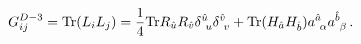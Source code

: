 \begin{equation}
\label{compute}
 G^{D-3}_{ij} = {\rm Tr }(L_iL_j)= \frac{1}{4} {\rm Tr} R_{\hat u}R_{\hat
v}\delta^{\hat u}_{~u}\delta^{\hat v}_{~v}+ {\rm Tr }(H_{\hat a}H_{\hat b})a^{\hat
a}_{~\alpha}a^{\hat b}_{~\beta}\, .
\end{equation} 
